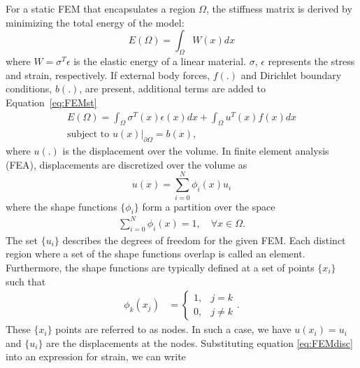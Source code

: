 \documentclass[journal]{IEEEtran}
\begin{document}
\section{}\label{ap:FEM}
For a static FEM that encapsulates a region $\Omega$, the stiffness matrix is derived by minimizing the total energy of the model:
\begin{equation} \label{eq:FEMst}
  E(\Omega) = \int_\Omega W(x)dx
\end{equation}
where $W=\sigma^T\epsilon$ is the elastic energy of a linear material. $\sigma$, $\epsilon$ represents the stress and strain, respectively. If external body forces, $f(.)$ and Dirichlet boundary conditions, $b(.)$, are present, additional terms are added to Equation~\eqref{eq:FEMst}
\begin{eqnarray} \label{eq:FEMen}
  E(\Omega) = \int_\Omega \sigma^T(x)\epsilon(x) dx + \int_\Omega u^T(x)f(x)dx\nonumber\\
  \text{subject to } \left.u(x)\right|_{\partial \Omega} = b(x),
\end{eqnarray}
where $u(.)$ is the displacement over the volume. In finite element analysis (FEA), displacements are discretized over the volume as
\begin{equation} \label{eq:FEMdisc}
  u(x) = \sum_{i=0}^N\phi_i(x)u_i
\end{equation}
where the shape functions $\{\phi_i\}$ form a partition over the space
\begin{align}
 \sum_{i=0}^N\phi_i(x) = 1, \quad \forall x\in\Omega.
\end{align}
The set $\{u_i\}$ describes the degrees of freedom for the given FEM. Each distinct region where a set of the shape functions overlap is called an element. Furthermore, the shape functions are typically defined at a set of points $\{x_i\}$ such that
\begin{align}
  \phi_k(x_j)& =  \begin{cases}
		    1, & j=k\\
		    0, & j\neq k
		  \end{cases}.
\end{align}
These $\{x_i\}$ points are referred to as nodes. In such a case, we have $u(x_i)=u_i$ and $\{u_i\}$ are the displacements at the nodes. Substituting equation \eqref{eq:FEMdisc} into an expression for strain, we can write
\end{document}

